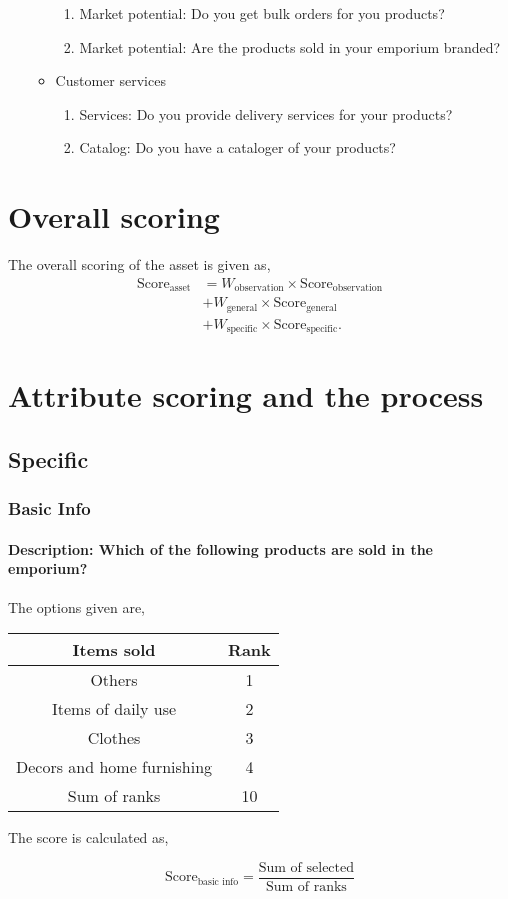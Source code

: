 \documentclass[oneside,twocolumn]{article}
\newcommand{\tsub}[2]{\text{#1}_{\text{#2}}}
\newcommand{\tsubb}[2]{#1_{\text{#2}}}
\newcommand{\dsub}[2]{\dfrac{\text{#1}}{\text{#2}}}
\newcommand{\multsel}[1]
{
	\[
		\tsub{Score}{#1} = \dsub{Sum of selected}{Sum of ranks}
	\]
}
\newenvironment{ttable}
{
\begin{center}
\begin{tabular}{c|c}
\hline
}
{
\\ \hline
\end{tabular}
\end{center}
}
\begin{document}
\begin{itemize}
\begin{itemize}
\begin{enumerate}
					\item Market potential: Do you get bulk orders for you products?
					\item Market potential: Are the products sold in your emporium branded?
				\end{enumerate}
			\item Customer services
				\begin{enumerate}
					\item Services: Do you provide delivery services for your products?
					\item Catalog: Do you have a cataloger of your products?
				\end{enumerate}
		\end{itemize}
\end{itemize}

\section{Overall scoring}
The overall scoring of the asset is given as,
\begin{align*}
	\tsub{Score}{asset} &= \tsubb{W}{observation} \times \tsub{Score}{observation} \\
	&+ \tsubb{W}{general} \times \tsub{Score}{general} \\
	&+ \tsubb{W}{specific} \times \tsub{Score}{specific}.
\end{align*}

\section{Attribute scoring and the process}
\subsection{Specific}
\subsubsection{Basic Info}
\paragraph{Description: Which of the following products are sold in the emporium?}
The options given are,
\begin{ttable}
	Items sold & Rank \\ \hline
	Others & 1 \\
	Items of daily use & 2 \\
	Clothes & 3 \\
	Decors and home furnishing & 4 \\ \hline
	Sum of ranks & 10
\end{ttable}
The score is calculated as,
\multsel{basic info}
\end{document}
